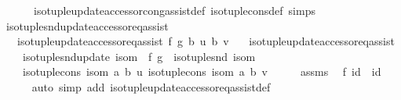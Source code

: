 \begin{isabellebody}
\ \ \ \ \ \ iso{\isacharunderscore}{\kern0pt}tuple{\isacharunderscore}{\kern0pt}update{\isacharunderscore}{\kern0pt}accessor{\isacharunderscore}{\kern0pt}cong{\isacharunderscore}{\kern0pt}assist{\isacharunderscore}{\kern0pt}def\ iso{\isacharunderscore}{\kern0pt}tuple{\isacharunderscore}{\kern0pt}cons{\isacharunderscore}{\kern0pt}def\ simps{\isacharparenright}{\kern0pt}\isanewline
{}\isamarkupfalse%
%
\endisatagproof
{\isafoldproof}%
%
\isadelimproof
\isanewline
%
\endisadelimproof
\isanewline
{}\isamarkupfalse%
\ iso{\isacharunderscore}{\kern0pt}tuple{\isacharunderscore}{\kern0pt}snd{\isacharunderscore}{\kern0pt}update{\isacharunderscore}{\kern0pt}accessor{\isacharunderscore}{\kern0pt}eq{\isacharunderscore}{\kern0pt}assist{\isacharcolon}{\kern0pt}\isanewline
\ \ \ {\isachardoublequoteopen}iso{\isacharunderscore}{\kern0pt}tuple{\isacharunderscore}{\kern0pt}update{\isacharunderscore}{\kern0pt}accessor{\isacharunderscore}{\kern0pt}eq{\isacharunderscore}{\kern0pt}assist\ f\ g\ b\ u\ b{\isacharprime}{\kern0pt}\ v{\isachardoublequoteclose}\isanewline
\ \ \ {\isachardoublequoteopen}iso{\isacharunderscore}{\kern0pt}tuple{\isacharunderscore}{\kern0pt}update{\isacharunderscore}{\kern0pt}accessor{\isacharunderscore}{\kern0pt}eq{\isacharunderscore}{\kern0pt}assist\isanewline
\ \ \ \ {\isacharparenleft}{\kern0pt}iso{\isacharunderscore}{\kern0pt}tuple{\isacharunderscore}{\kern0pt}snd{\isacharunderscore}{\kern0pt}update\ isom\ {\isasymcirc}\ f{\isacharparenright}{\kern0pt}\ {\isacharparenleft}{\kern0pt}g\ {\isasymcirc}\ iso{\isacharunderscore}{\kern0pt}tuple{\isacharunderscore}{\kern0pt}snd\ isom{\isacharparenright}{\kern0pt}\isanewline
\ \ \ \ {\isacharparenleft}{\kern0pt}iso{\isacharunderscore}{\kern0pt}tuple{\isacharunderscore}{\kern0pt}cons\ isom\ a\ b{\isacharparenright}{\kern0pt}\ u\ {\isacharparenleft}{\kern0pt}iso{\isacharunderscore}{\kern0pt}tuple{\isacharunderscore}{\kern0pt}cons\ isom\ a\ b{\isacharprime}{\kern0pt}{\isacharparenright}{\kern0pt}\ v{\isachardoublequoteclose}\isanewline
%
\isadelimproof
%
\endisadelimproof
%
\isatagproof
{}\isamarkupfalse%
\ {\isacharminus}{\kern0pt}\isanewline
\ \ \isamarkupfalse%
\ assms\ \isamarkupfalse%
\ {\isachardoublequoteopen}f\ id\ {\isacharequal}{\kern0pt}\ id{\isachardoublequoteclose}\isanewline
\ \ \ \ \isamarkupfalse%
\ {\isacharparenleft}{\kern0pt}auto\ simp\ add{\isacharcolon}{\kern0pt}\ iso{\isacharunderscore}{\kern0pt}tuple{\isacharunderscore}{\kern0pt}update{\isacharunderscore}{\kern0pt}accessor{\isacharunderscore}{\kern0pt}eq{\isacharunderscore}{\kern0pt}assist{\isacharunderscore}{\kern0pt}def\isanewline

\end{isabellebody}
